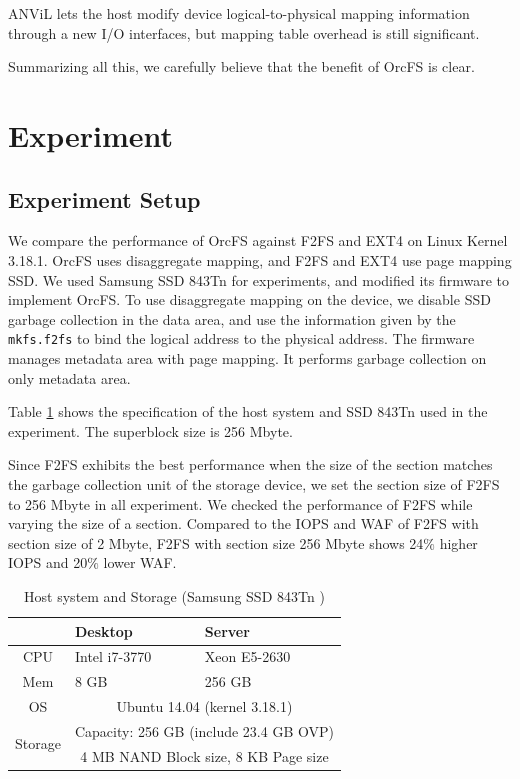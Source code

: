 \documentclass[pageno]{jpaper}
\begin{document}
ANViL \cite{anvil} lets the host modify device logical-to-physical
mapping information through a new I/O interfaces, but mapping table
overhead is still significant.

Summarizing all this, we carefully believe that the benefit of OrcFS
is clear.


\section{Experiment}
\label{sec:experiment}

\subsection{Experiment Setup}
\label{subsec:exp_setup}

We compare the performance of OrcFS against F2FS and EXT4 on Linux
Kernel 3.18.1. OrcFS uses disaggregate mapping, and F2FS and EXT4 use
page mapping SSD.  We used Samsung SSD 843Tn \cite{ssd843tn} for
experiments, and modified its firmware to implement OrcFS.  To use
disaggregate mapping on the device, we disable SSD garbage collection
in the data area, and use the information given by the
\texttt{mkfs.f2fs} to bind the logical address to the physical
address. The firmware manages metadata area with page mapping. It
performs garbage collection on only metadata area.


Table \ref{tab:ssd_info} shows the specification of the host system
and SSD 843Tn used in the experiment. The superblock size is 256
Mbyte.

Since F2FS exhibits the best performance when the size of the section
matches the garbage collection unit of the storage device, we set the
section size of F2FS to 256 Mbyte in all experiment.  We checked the
performance of F2FS while varying the size of a section.  Compared to
the IOPS and WAF of F2FS with section size of 2 Mbyte, F2FS with
section size 256 Mbyte shows 24$\%$ higher IOPS and 20$\%$ lower WAF.


\begin{table}[t]
\begin{center}
\begin{tabular}{|c|p{3cm}|p{3cm}|} \hline
  		     & Desktop	& Server	\\ \hline\hline
CPU & Intel i7-3770 & Xeon E5-2630 \\ \hline
Mem & 8 GB & 256 GB \\ \hline
OS & \multicolumn{2}{c|}{Ubuntu 14.04 (kernel 3.18.1)} \\ \hline
\multirow{2}{*}{Storage} & \multicolumn{2}{c|}{Capacity: 256 GB (include 23.4 GB OVP)}  \\ 
		 & \multicolumn{2}{c|}{4 MB NAND Block size, 8 KB Page size}  \\ \hline
\end{tabular}
\end{center}
\caption{Host system and Storage (Samsung SSD 843Tn \cite{ssd843tn})}
\label{tab:ssd_info}
\end{table}
\end{document}
